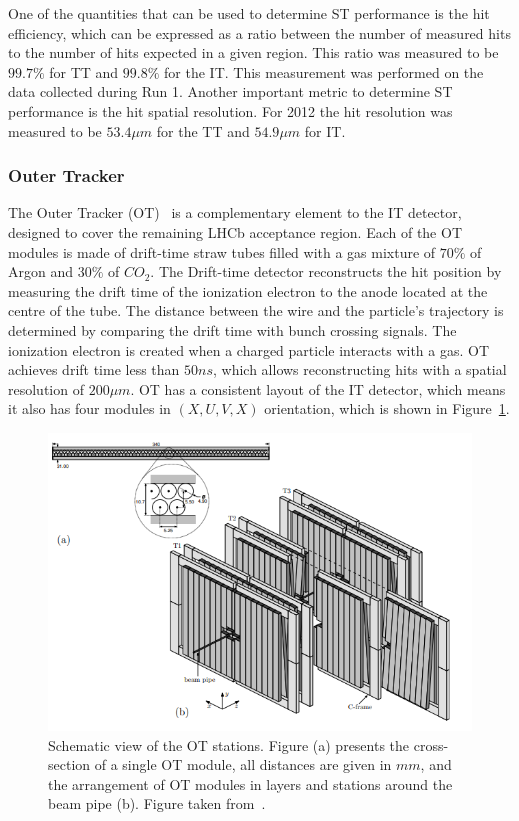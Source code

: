One of the quantities that can be used to determine ST performance is the hit efficiency, which can be expressed as a ratio between the number of measured hits to the number of hits expected in a given region. This ratio was measured to be $99.7\%$ for TT and $99.8\%$ for the IT. This measurement was performed on the data collected during Run 1. Another important metric to determine ST performance is the hit spatial resolution.  For 2012 the hit resolution was measured to be $53.4 \mu m$ for the TT and $54.9 \mu m$ for IT.  


\subsubsection{Outer Tracker}

 The Outer Tracker (OT)~\cite{OT} is a complementary element to the IT detector, designed to cover the remaining LHCb acceptance region. Each of the OT modules is made of drift-time straw tubes filled with a gas mixture of $70\%$ of Argon and $30\%$ of $CO_2$. 
The Drift-time detector reconstructs the hit position by measuring the drift time of the ionization electron to the anode located at the centre of the tube. The distance between the wire and the particle's trajectory is determined by comparing the drift time with bunch crossing signals.  The ionization electron is created when a charged particle interacts with a gas. OT achieves drift time less than $50 ns$, which allows reconstructing hits with a spatial resolution of $200 \mu m$. OT has a consistent layout of the IT detector, which means it also has four modules in  $(X, U, V, X)$ orientation, which is shown in Figure~\ref{fig:OT}. 


\begin{figure}[!hb]
\centering
\includegraphics[scale=0.7]{figures/OT.PNG}
\caption{Schematic view of the OT stations. Figure (a) presents the cross-section of a single OT module, all distances are given in $mm$, and the arrangement of OT modules in layers and stations around the beam pipe (b).  Figure taken from~\cite{lhcb}.
\label{fig:OT}}
\end{figure}

